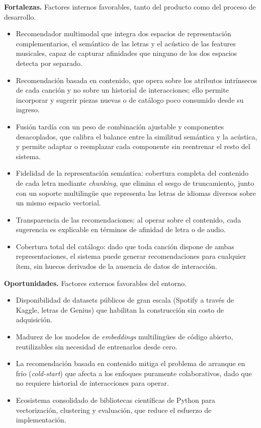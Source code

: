 \textbf{Fortalezas.} Factores internos favorables, tanto del producto como del proceso de desarrollo.
\begin{itemize}
    \item Recomendador multimodal que integra dos espacios de representación complementarios, el semántico de las letras y el acústico de las features musicales, capaz de capturar afinidades que ninguno de los dos espacios detecta por separado.
    \item Recomendación basada en contenido, que opera sobre los atributos intrínsecos de cada canción y no sobre un historial de interacciones; ello permite incorporar y sugerir piezas nuevas o de catálogo poco consumido desde su ingreso.
    \item Fusión tardía con un peso de combinación ajustable y componentes desacoplados, que calibra el balance entre la similitud semántica y la acústica, y permite adaptar o reemplazar cada componente sin reentrenar el resto del sistema.
    \item Fidelidad de la representación semántica: cobertura completa del contenido de cada letra mediante \textit{chunking}, que elimina el sesgo de truncamiento, junto con un soporte multilingüe que representa las letras de idiomas diversos sobre un mismo espacio vectorial.
    \item Transparencia de las recomendaciones: al operar sobre el contenido, cada sugerencia es explicable en términos de afinidad de letra o de audio.
    \item Cobertura total del catálogo: dado que toda canción dispone de ambas representaciones, el sistema puede generar recomendaciones para cualquier ítem, sin huecos derivados de la ausencia de datos de interacción.
\end{itemize}

\textbf{Oportunidades.} Factores externos favorables del entorno.
\begin{itemize}
    \item Disponibilidad de datasets públicos de gran escala (Spotify a través de Kaggle, letras de Genius) que habilitan la construcción  sin costo de adquisición.
    \item Madurez de los modelos de \textit{embeddings} multilingües de código abierto, reutilizables sin necesidad de entrenarlos desde cero.
    \item La recomendación basada en contenido mitiga el problema de arranque en frío (\textit{cold-start}) que afecta a los enfoques puramente colaborativos, dado que no requiere historial de interacciones para operar.
    \item Ecosistema consolidado de bibliotecas científicas de Python para vectorización, clustering y evaluación, que reduce el esfuerzo de implementación.
\end{itemize}

